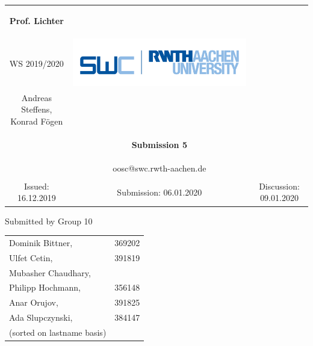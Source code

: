 \begin{tabular}{ccc}
		\begin{large} \textbf{Prof. Lichter} \end{large} &
		
		\begin{minipage}[H]{3.5cm}
			\centering
			\begin{large} OOSC \end{large} \\
			\begin{large} WS 2019/2020 \end{large}
		\end{minipage} &
		
		\begin{minipage}[H]{4cm}
			\includegraphics[keepaspectratio,width=\textwidth,angle=0]{images/swc.png}
		\end{minipage} \\
		Andreas Steffens, Konrad F\"ogen &  &  \\
		& \begin{huge} \textbf{Submission 5} \end{huge}&  \\
		& oosc@swc.rwth-aachen.de &  \\
		& & \\
		Issued: 16.12.2019 &
		Submission: 06.01.2020 &
		Discussion: 09.01.2020 \\
	\end{tabular}
	\newline \newline \newline
	\begin{center}
		Submitted by Group 10
		
		\begin{tabular}{ll}
			Dominik Bittner, & 369202 \\
			Ulfet Cetin, & 391819\\
			Mubasher Chaudhary, & \\
			Philipp Hochmann, & 356148 \\
			Anar Orujov, & 391825\\
			Ada Slupczynski, & 384147\\
			(sorted on lastname basis)
		\end{tabular}
	\end{center}